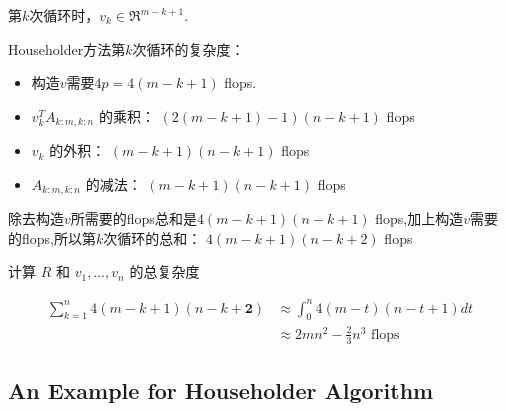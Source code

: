 第$k$次循环时，$v_k \in \mathfrak{R}^{m - k + 1}$.

Householder方法第$k$次循环的复杂度：

\begin{itemize}
    \item 构造$v$需要$4p = 4(m - k + 1)$ flops.
    \item $ v_{k}^{T} A_{k: m, k: n} $ 的乘积： $ (2({m}-{k}+1)-1)({n}-{k}+1) $ flops
    \item $ v_{k} $ 的外积： $ (m-k+1)(n-k+1) $ flops
    \item $ A_{k: m, k: n} $ 的减法： $ ({m}-{k}+1)({n}-{k}+1) $ flops
\end{itemize}

除去构造$v$所需要的flops总和是$ 4({m}-{k}+1)({n}-{k}+1) $ flops,加上构造$v$需要的flops,所以第$k$次循环的总和： $ 4({m}-{k}+1)({n}-{k}+2) $ flops

\begin{theorem}
    计算 $ R $ 和 $ v_{1}, \ldots, v_{n} $ 的总复杂度

\begin{equation} \begin{aligned} \sum_{k=1}^{n} 4(m-k+1)(n-k+\boldsymbol{2}) & \approx \int_{0}^{n} 4(m-t)(n-t+1) d t \\ & \approx 2 m n^{2}-\frac{2}{3} n^{3} \text { flops } \end{aligned} \end{equation}
\end{theorem}



\subsection{An Example for Householder Algorithm}

